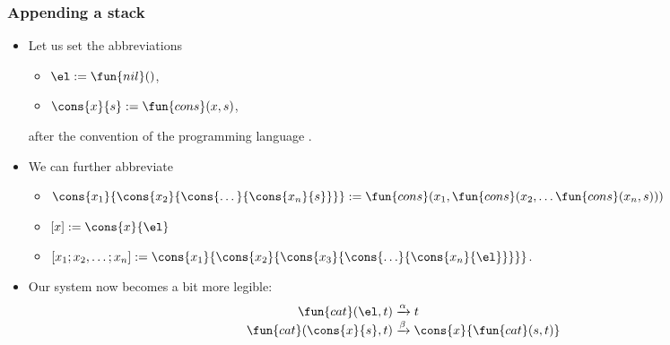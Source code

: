 \documentclass[compress,dvips,xcolor={dvipsnames},t]{beamer}
\begin{document}
\begin{frame}
  \frametitle{Appending a stack}

  \begin{itemize}

    \item Let us set the abbreviations
      \begin{itemize}

        \item \(\el := \fun{nil}()\),

        \item \(\cons{x}{s} := \fun{cons}(x,s)\),

      \end{itemize}
      after the convention of the programming language \OCaml.

    \item We can further abbreviate
      \begin{itemize}

        \item \(\cons{x_1}{\cons{x_2}{\cons{\dots}{\cons{x_n}{s}}}} :=
          \fun{cons}(x_1, \fun{cons}(x_2, \dots \fun{cons}(x_n,s)))\)

        \item \([x] := \cons{x}{\el}\)

        \item \([x_1; x_2, \dots; x_n] :=
          \cons{x_1}{\cons{x_2}{\cons{x_3}{\cons{\ldots}{\cons{x_n}{\el}}}}}\).
      \end{itemize}

    \item Our system now becomes a bit more legible:
      \begin{align*}
        \fun{cat}(        \el,t) &\xrightarrow{\alpha} t\\
        \fun{cat}(\cons{x}{s},t) &\xrightarrow{\smash{\beta}}
        \cons{x}{\fun{cat}(s,t)}
      \end{align*}

  \end{itemize}

\end{frame}
\end{document}

